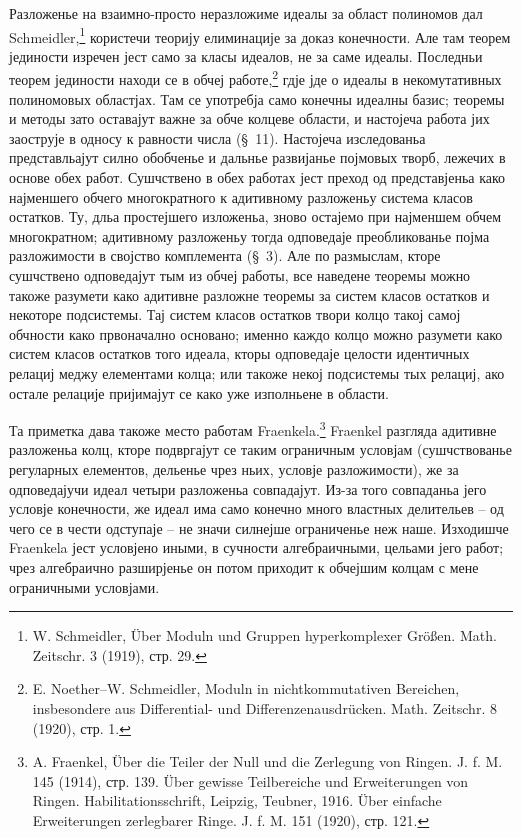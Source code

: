 ﻿\documentclass[11pt]{article}
\begin{document}
Разложенье на взаимно-просто неразложиме идеалы за област полиномов дал Schmeidler,\footnote{W. Schmeidler, Über Moduln und Gruppen hyperkomplexer Größen. Math. Zeitschr. 3 (1919), стр. 29.} користечи теорију елиминације за доказ конечности. Але там теорем јединости изречен јест само за класы идеалов, не за саме идеалы. Последньи теорем јединости находи се в обчеј работе,\footnote{E. Noether--W. Schmeidler, Moduln in nichtkommutativen Bereichen, insbesondere aus Differential- und Differenzenausdrücken. Math. Zeitschr. 8 (1920), стр. 1.} гдје јде о идеалы в некомутативных полиномовых областјах. Там се употребја само конечны идеалны базис; теоремы и методы зато оставајут важне за обче колцеве области, и настојеча работа јих заострује в односу к равности числа (\S~11). Настојеча изследованьа представльајут силно обобченье и дальнье развијанье појмовых творб, лежечих в основе обех работ. Сушчствено в обех работах јест преход од представјеньа како најменшего обчего многократного к адитивному разложеньу система класов остатков. Ту, дльа простејшего изложеньа, зново остајемо при најменшем обчем многократном; адитивному разложеньу тогда одповедаје преобликованье појма разложимости в својство комплемента (\S~3). Але по размыслам, кторе сушчствено одповедајут тым из обчеј работы, все наведене теоремы можно такоже разумети како адитивне разложне теоремы за систем класов остатков и некоторе подсистемы. Тај систем класов остатков твори колцо такој самој обчности како првоначално основано; именно каждо колцо можно разумети како систем класов остатков того идеала, кторы одповедаје целости идентичных релациј меджу елементами колца; или такоже некој подсистемы тых релациј, ако остале релације пријимајут се како уже изполньене в области.

Та приметка дава такоже место работам Fraenkela.\footnote{A. Fraenkel, Über die Teiler der Null und die Zerlegung von Ringen. J. f. M. 145 (1914), стр. 139. Über gewisse Teilbereiche und Erweiterungen von Ringen. Habilitationsschrift, Leipzig, Teubner, 1916. Über einfache Erweiterungen zerlegbarer Ringe. J. f. M. 151 (1920), стр. 121.} Fraenkel разгляда адитивне разложеньа колц, кторе подвргајут се таким ограничным условјам (сушчствованье регуларных елементов, дельенье чрез ньих, условје разложимости), же за одповедајучи идеал четыри разложеньа совпадајут. Из-за того совпаданьа јего условје конечности, же идеал има само конечно много властных делительев -- од чего се в чести одступаје -- не значи силнејше ограниченье неж наше. Изходишче Fraenkela јест условјено иными, в сучности алгебраичными, цельами јего работ; чрез алгебраично разширјенье он потом приходит к обчејшим колцам с мене ограничными условјами.

\clearpage
\end{document}
